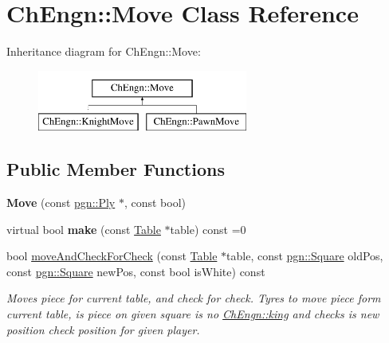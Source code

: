 \hypertarget{classChEngn_1_1Move}{
\section{ChEngn::Move Class Reference}
\label{classChEngn_1_1Move}
}
Inheritance diagram for ChEngn::Move:\begin{figure}[H]
\begin{center}
\leavevmode
\includegraphics[height=2.000000cm]{classChEngn_1_1Move}
\end{center}
\end{figure}
\subsection*{Public Member Functions}
\begin{DoxyCompactItemize}
\item 
\hypertarget{classChEngn_1_1Move_a64fb193e2a023b7ac8f635c28aa732d1}{
{\bfseries Move} (const \hyperlink{classpgn_1_1Ply}{pgn::Ply} $\ast$, const bool)}
\label{classChEngn_1_1Move_a64fb193e2a023b7ac8f635c28aa732d1}

\item 
\hypertarget{classChEngn_1_1Move_a9996c7a9c1af882bb6d1f03b3e6cd6a1}{
virtual bool {\bfseries make} (const \hyperlink{classChEngn_1_1Table}{Table} $\ast$table) const =0}
\label{classChEngn_1_1Move_a9996c7a9c1af882bb6d1f03b3e6cd6a1}

\item 
bool \hyperlink{classChEngn_1_1Move_a942b9c4b2660db1055de6df7b6f5d2e3}{moveAndCheckForCheck} (const \hyperlink{classChEngn_1_1Table}{Table} $\ast$table, const \hyperlink{classpgn_1_1Square}{pgn::Square} oldPos, const \hyperlink{classpgn_1_1Square}{pgn::Square} newPos, const bool isWhite) const 
\begin{DoxyCompactList}\small\item\em Moves piece for current table, and check for check. Tyres to move piece form current table, is piece on given square is no \hyperlink{namespaceChEngn_a40c2dbaf0963b46704f08ffb28364cea}{ChEngn::king} and checks is new position check position for given player. \item\end{DoxyCompactList}\end{DoxyCompactItemize}

